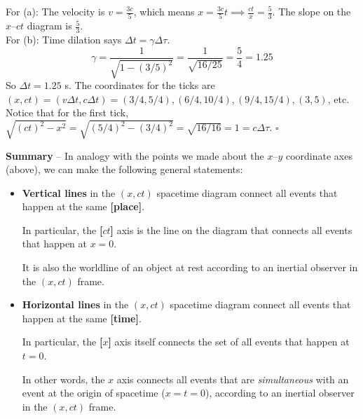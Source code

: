 \documentclass[11pt, letterpaper, openany]{book}
\newenvironment{solution}[1][Solution]{%
  \tcolorbox[blanker, breakable, left=1em,
    before skip=1em, after skip=1em,
    borderline west={2pt}{0pt}{PhysTeal},
    colback=PhysCream,
    before upper={\textcolor{PhysTeal}{\sffamily\bfseries #1.}\space}
  ]%
}{%
  \hfill\textcolor{PhysTeal}{\ensuremath{\square}}\endtcolorbox%
}
\begin{document}
\begin{solution}
For (a): The velocity is $v = \frac{3c}{5}$, which means $x = \frac{3c}{5}t \implies \frac{ct}{x} = \frac{5}{3}$. The slope on the $x$--$ct$ diagram is $\frac{5}{3}$.\\
For (b): Time dilation says $\Delta t = \gamma \Delta \tau$.
\[ \gamma = \frac{1}{\sqrt{1-(3/5)^2}} = \frac{1}{\sqrt{16/25}} = \frac{5}{4} = 1.25 \]
So $\Delta t = 1.25$ s. The coordinates for the ticks are $(x, ct) = (v\Delta t, c\Delta t) = (3/4, 5/4), (6/4, 10/4), (9/4, 15/4), (3, 5)$, etc.
Notice that for the first tick, $\sqrt{(ct)^2 - x^2} = \sqrt{(5/4)^2 - (3/4)^2} = \sqrt{16/16} = 1 = c\Delta \tau$.
\end{solution}

\begin{center}
\end{center}

\textbf{Summary} -- In analogy with the points we made about the $x$--$y$ coordinate axes (above), we can make the following general statements:
\begin{itemize}
    \item \textbf{Vertical lines} in the $(x, ct)$ spacetime diagram connect all events that happen at the same \textbf{[place]}.
    
    In particular, the \textbf{[$ct$]} axis is the line on the diagram that connects all events that happen at $x=0$.
    
    It is also the worldline of an object at rest according to an inertial observer in the $(x, ct)$ frame.
    \item \textbf{Horizontal lines} in the $(x, ct)$ spacetime diagram connect all events that happen at the same \textbf{[time]}.
    
    In particular, the \textbf{[$x$]} axis itself connects the set of all events that happen at $t=0$.
    
    In other words, the $x$ axis connects all events that are \textit{simultaneous} with an event at the origin of spacetime ($x=t=0$), according to an inertial observer in the $(x, ct)$ frame.
\end{itemize}
\end{document}
